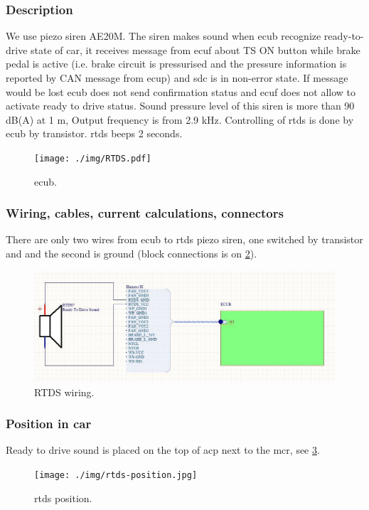 
\subsubsection{Description}

We use piezo siren AE20M. The siren makes sound when \gls{ecub} recognize ready-to-drive state of car, it receives message from \gls{ecuf} about TS ON button while brake pedal is active (i.e. brake circuit is pressurised and the pressure information is reported by CAN message from \gls{ecup}) and \gls{sdc} is in non-error state. If message would be lost \gls{ecub} does not send confirmation status and \gls{ecuf} does not allow to activate ready to drive status. Sound pressure level of this siren is more than 90 dB(A) at 1 m, Output frequency is from 2.9 kHz. Controlling of \gls{rtds} is done by \gls{ecub} by transistor. \gls{rtds} beeps 2 seconds.

\begin{figure}[H]
	\centering
	\texttt{[image: ./img/RTDS.pdf]}
	\caption{\gls{ecub}.}
	\label{fig:RTDS}
\end{figure}

\subsubsection{Wiring, cables, current calculations, connectors}

There are only two wires from \gls{ecub} to \gls{rtds} piezo siren, one switched by transistor and and the second is ground (block connections is on \ref{fig:RTDS-wiring}).

\begin{figure}[H]
	\centering
	\includegraphics[width=\textwidth]{./img/rtds-wiring.jpg}
	\caption{RTDS wiring.}
	\label{fig:RTDS-wiring}
\end{figure}
\subsubsection{Position in car}

Ready to drive sound is placed on the top of \gls{acp} next to the \gls{mcr}, see \ref{fig:RTDS-position}.
\begin{figure}[H]
	\centering
	\texttt{[image: ./img/rtds-position.jpg]}
	\caption{\Gls{rtds} position.}
	\label{fig:RTDS-position}
\end{figure}
